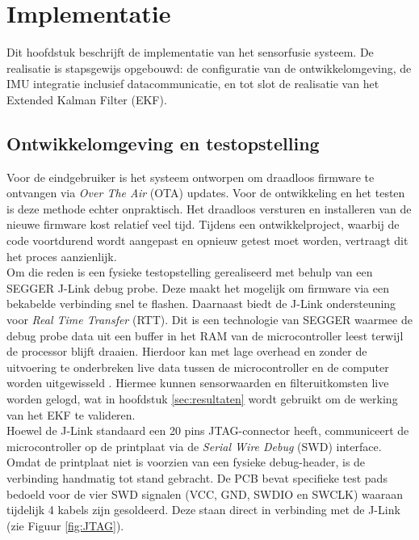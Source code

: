 \section{Implementatie}
\label{sec:implementatie}

Dit hoofdstuk beschrijft de implementatie van het sensorfusie systeem. De realisatie is stapsgewijs opgebouwd: de configuratie van de ontwikkelomgeving, de IMU integratie inclusief datacommunicatie, en tot slot de realisatie van het Extended Kalman Filter (EKF).

\subsection{Ontwikkelomgeving en testopstelling}

Voor de eindgebruiker is het systeem ontworpen om draadloos firmware te ontvangen via \textit{Over The Air} (OTA) updates. Voor de ontwikkeling en het testen is deze methode echter onpraktisch. Het draadloos versturen en installeren van de nieuwe firmware kost relatief veel tijd. Tijdens een ontwikkelproject, waarbij de code voortdurend wordt aangepast en opnieuw getest moet worden, vertraagt dit het proces aanzienlijk. \\

Om die reden is een fysieke testopstelling gerealiseerd met behulp van een SEGGER J-Link debug probe. Deze maakt het mogelijk om firmware via een bekabelde verbinding snel te flashen. Daarnaast biedt de J-Link ondersteuning voor \textit{Real Time Transfer} (RTT). Dit is een technologie van SEGGER waarmee de debug probe data uit een buffer in het RAM van de microcontroller leest terwijl de processor blijft draaien. Hierdoor kan met lage overhead en zonder de uitvoering te onderbreken live data tussen de microcontroller en de computer worden uitgewisseld \cite{segger_rtt}. Hiermee kunnen sensorwaarden en filteruitkomsten live worden gelogd, wat in hoofdstuk \ref{sec:resultaten} wordt gebruikt om de werking van het EKF te valideren. \\

Hoewel de J-Link standaard een 20 pins JTAG-connector heeft, communiceert de microcontroller op de printplaat via de \textit{Serial Wire Debug} (SWD) interface. Omdat de printplaat niet is voorzien van een fysieke debug-header, is de verbinding handmatig tot stand gebracht. De PCB bevat specifieke test pads bedoeld voor de vier SWD signalen (VCC, GND, SWDIO en SWCLK) waaraan tijdelijk 4 kabels zijn gesoldeerd. Deze staan direct in verbinding met de J-Link (zie Figuur \ref{fig:JTAG}).

